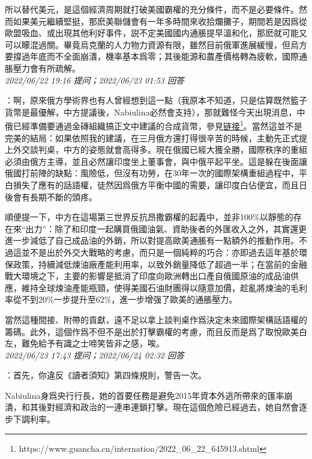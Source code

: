 \documentclass[twocolumn]{ctexart}
\begin{document}
所以替代美元，是這個經濟周期就打破美國霸權的充分條件，而不是必要條件。然而如果美元繼續堅挺，那麽美聯儲會有一年多時間來收拾爛攤子，期間若是因爲從歐盟吸血、或出現其他利好事件，説不定美國國内通脹提早溫和化，那麽就可能又可以矇混過關。畢竟烏克蘭的人力物力資源有限，雖然目前俄軍進展緩慢，但烏方要撐過年底而不全面崩潰，機率基本爲零；其後能源和農產價格轉為疲軟，國際通脹壓力會有所疏解。
\\

\textit{\hfill\noindent\small 2022/06/22 19:16 提问；2022/06/23 01:53 回答}

：啊，原來俄方學術界也有人曾經想到這一點（我原本不知道，只是估算既然籃子貨幣是最優解，中方提議後，Nabiulina必然會支持），那就難怪今天出現消息，中俄已經準備要通過金磚組織搞正文中建議的合成貨幣，參見\href{https://www.guancha.cn/internation/2022\_06\_22\_645913.shtml}{链接\footnote{\url{https://www.guancha.cn/internation/2022\_06\_22\_645913.shtml}}}。當然這並不是完美的結局：如果依照我的建議，在三月俄方還打得很辛苦的時候，主動先正式提上外交談判桌，中方的姿態就會高得多。現在俄國已經大獲全勝，國際秩序的重組必須由俄方主導，並且必然讓印度坐上董事會，與中俄平起平坐。這是躲在後面讓俄國打前陣的缺點：風險低，但沒有功勞，在30年一次的國際架構重組過程中，平白損失了應有的話語權，徒然因爲俄方平衡中國的需要，讓印度白佔便宜，而且日後會有長期不斷的頭疼。

順便提一下，中方在這場第三世界反抗昂撒霸權的起義中，並非100\%以靜態的存在來“出力”：除了和印度一起購買俄國油氣、資助後者的外匯收入之外，其實還更進一步減低了自己成品油的外銷，所以對提高歐美通脹有一點額外的推動作用。不過這並不是出於外交大戰略的考慮，而只是一個純粹的巧合：亦即過去這年基於環保政策，持續減低煉油廠產能利用率，以致外銷量降低了超過一半；在當前的金融戰大環境之下，主要的影響是抵消了印度向歐洲轉出口產自俄國原油的成品油供應，維持全球煉油產能瓶頸，使得美國石油財團得以隨意加價，趁亂將煉油的毛利率從不到20\%一步提升至62\%，進一步增强了歐美的通脹壓力。

當然這種間接、附帶的貢獻，遠不足以拿上談判桌作爲決定未來國際架構話語權的籌碼。此外，這個作爲不但不是出於打擊霸權的考慮，而且反而是爲了取悅歐美白左，難免給予有識之士啼笑皆非之感，唉。
\\

\textit{\hfill\noindent\small 2022/06/23 17:43 提问；2022/06/24 02:32 回答}

：首先，你違反《讀者須知》第四條規則，警告一次。

Nabiulina身爲央行行長，她的首要任務是避免2015年資本外逃所帶來的匯率崩潰，和其後對經濟和政治的一連串連鎖打擊。現在這個危險已經過去，她自然會逐步下調利率。
\end{document}
